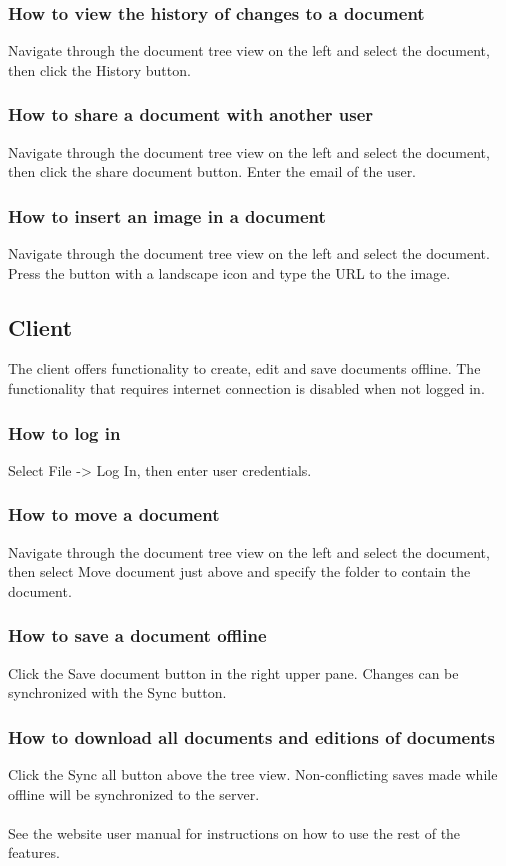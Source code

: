 \documentclass[a4paper,11pt,report]{report}
\begin{document}
\subsubsection {How to view the history of changes to a document}
Navigate through the document tree view on the left and select the document, then click the History button.
\subsubsection {How to share a document with another user}
Navigate through the document tree view on the left and select the document, then click the share document button. Enter the email of the user.
\subsubsection {How to insert an image in a document}
Navigate through the document tree view on the left and select the document. Press the button with a landscape icon and type the URL to the image.
\subsection{Client}
The client offers functionality to create, edit and save documents offline. The functionality that requires internet connection is disabled when not logged in.
\subsubsection {How to log in}
Select File -> Log In, then enter user credentials.
\subsubsection {How to move a document}
Navigate through the document tree view on the left and select the document, then select Move document just above and specify the folder to contain the document. 
\subsubsection {How to save a document offline}
Click the Save document button in the right upper pane. Changes can be synchronized with the Sync button. 
\subsubsection {How to download all documents and editions of documents}
Click the Sync all button above the tree view. Non-conflicting saves made while offline will be synchronized to the server. 
\\ \\
See the website user manual for instructions on how to use the rest of the features.
\end{document}
